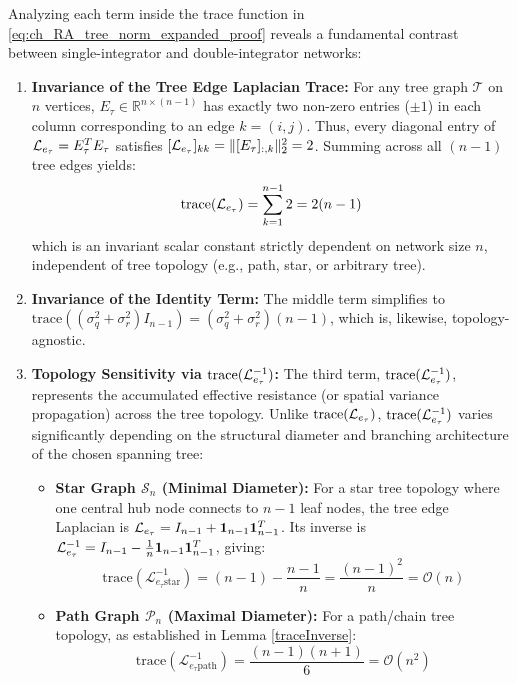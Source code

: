 Analyzing each term inside the trace function in \eqref{eq:ch_RA_tree_norm_expanded_proof} reveals a fundamental contrast between single-integrator and double-integrator networks:

\begin{enumerate}
    \item \textbf{Invariance of the Tree Edge Laplacian Trace:}
    For any tree graph $\mathcal{T}$ on $n$ vertices, $E_\tau \in \mathbb{R}^{n \times (n-1)}$ has exactly two non-zero entries ($\pm 1$) in each column corresponding to an edge $k = (i,j)$. Thus, every diagonal entry of $\mathcal{L}_{e_{\tau}} = E_\tau^T E_\tau$ satisfies $[\mathcal{L}_{e_{\tau}}]_{kk} = \|[E_\tau]_{:,k}\|_2^2 = 2$. Summing across all $(n-1)$ tree edges yields:
    \begin{equation}
        \text{trace}(\mathcal{L}_{e_{\tau}}) = \sum_{k=1}^{n-1} 2 = 2(n-1)
    \end{equation}
    which is an invariant scalar constant strictly dependent on network size $n$, independent of tree topology (e.g., path, star, or arbitrary tree).
    
    \item \textbf{Invariance of the Identity Term:}
    The middle term simplifies to $\text{trace}((\sigma_q^2 + \sigma_r^2) I_{n-1}) = (\sigma_q^2 + \sigma_r^2)(n-1)$, which is, likewise, topology-agnostic.

    \item \textbf{Topology Sensitivity via $\text{trace}(\mathcal{L}_{e_{\tau}}^{-1})$:}
    The third term, $\text{trace}(\mathcal{L}_{e_{\tau}}^{-1})$, represents the accumulated effective resistance (or spatial variance propagation) across the tree topology. Unlike $\text{trace}(\mathcal{L}_{e_{\tau}})$, $\text{trace}(\mathcal{L}_{e_{\tau}}^{-1})$ varies significantly depending on the structural diameter and branching architecture of the chosen spanning tree:
    \begin{itemize}
        \item \textbf{Star Graph $\mathcal{S}_n$ (Minimal Diameter):} For a star tree topology where one central hub node connects to $n-1$ leaf nodes, the tree edge Laplacian is $\mathcal{L}_{e_{\tau}} = I_{n-1} + \mathbf{1}_{n-1} \mathbf{1}_{n-1}^T$. Its inverse is $\mathcal{L}_{e_{\tau}}^{-1} = I_{n-1} - \frac{1}{n} \mathbf{1}_{n-1} \mathbf{1}_{n-1}^T$, giving:
        \begin{equation}
            \text{trace}(\mathcal{L}_{e_\tau\text{star}}^{-1}) = (n-1) - \frac{n-1}{n} = \frac{(n-1)^2}{n} = \mathcal{O}(n)
        \end{equation}
        \item \textbf{Path Graph $\mathcal{P}_n$ (Maximal Diameter):} For a path/chain tree topology, as established in Lemma \ref{traceInverse}:
        \begin{equation}
            \text{trace}(\mathcal{L}_{e_\tau\text{path}}^{-1}) = \frac{(n-1)(n+1)}{6} = \mathcal{O}(n^2)
        \end{equation}
    \end{itemize}
\end{enumerate}

